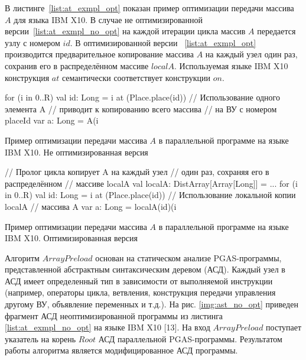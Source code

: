 В листинге~\ref{list:at_exmpl_opt} показан пример оптимизации передачи массива 
$A$ для языка IBM X10. В случае не оптимизированной 
версии~\ref{list:at_exmpl_no_opt} на каждой итерации цикла массив $A$ передается 
узлу с номером $id$. В оптимизированной версии ~\ref{list:at_exmpl_opt} 
производится предварительное копирование массива $A$ на каждый узел один раз, 
сохранив его в распределённом массиве $localA$. Используемая языке IBM X10 
конструкция $at$ семантически соответствует конструкции $on$. 

\begin{ListingEnv}[!h]
    \begin{Verb}
for (i in 0..R) {
    val id: Long = i %
    at (Place.place(id)) {
        // Использование одного элемента A
        // приводит к копированию всего массива
        // на ВУ с номером placeId
        var a: Long = A(i %
    }
}
    \end{Verb}
    \caption{Пример оптимизации передачи массива $A$ в параллельной программе на 
языке IBM X10. Не оптимизированная версия}
    \label{list:at_exmpl_no_opt}
\end{ListingEnv}

\begin{ListingEnv}[!h]
    \begin{Verb}
// Пролог цикла копирует A на каждый узел
// один раз, сохраняя его в распределённом
// массиве localA
val localA: DistArray[Array[Long]] = ...
for (i in 0..R) {
    val id: Long = i %
    at (Place.place(id)) {
        // Использование локальной копии localA
        // массива A
        var a: Long = localA(id)(i %
    }
}
    \end{Verb}
    \caption{Пример оптимизации передачи массива $A$ в параллельной программе на 
языке IBM X10. Оптимизированная версия}
    \label{list:at_exmpl_opt}
\end{ListingEnv}

Алгоритм $ArrayPreload$ основан на статическом анализе PGAS-программы, 
представленной абстрактным синтаксическим деревом (АСД). Каждый узел в АСД имеет 
определенный тип в зависимости от выполняемой инструкции (например, операторы 
цикла, ветвления, конструкция передачи управления другому ВУ, объявление 
переменных и т.д.). На рис. \ref{img:ast_no_opt} приведен фрагмент АСД 
неоптимизированной программы из листинга \ref{list:at_exmpl_no_opt} на языке IBM 
X10 [13]. На вход $ArrayPreload$ поступает указатель на корень $Root$ АСД 
параллельной PGAS-программы. Результатом работы алгоритма является 
модифицированное АСД программы. 

